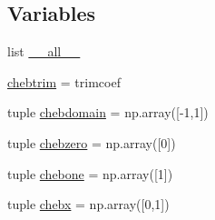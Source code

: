 \subsection*{Variables}
\begin{DoxyCompactItemize}
\item 
list \hyperlink{namespacepyneb_1_1utils_1_1chebyshev_aa4a022e6ddacd362b83964da5cc5d044}{\-\_\-\-\_\-all\-\_\-\-\_\-}
\item 
\hyperlink{namespacepyneb_1_1utils_1_1chebyshev_ab0a0ced0266ea763728bee66b728cbff}{chebtrim} = trimcoef
\item 
tuple \hyperlink{namespacepyneb_1_1utils_1_1chebyshev_abd5a8e86847ca6ea59d2a192f28604d4}{chebdomain} = np.\-array(\mbox{[}-\/1,1\mbox{]})
\item 
tuple \hyperlink{namespacepyneb_1_1utils_1_1chebyshev_aadda3e168aefd0f4b28a9d7cab6ad412}{chebzero} = np.\-array(\mbox{[}0\mbox{]})
\item 
tuple \hyperlink{namespacepyneb_1_1utils_1_1chebyshev_ad07bc7eff7bee500f8644792e4f69712}{chebone} = np.\-array(\mbox{[}1\mbox{]})
\item 
tuple \hyperlink{namespacepyneb_1_1utils_1_1chebyshev_a0ce7dddbafb225b28442052d01115054}{chebx} = np.\-array(\mbox{[}0,1\mbox{]})
\end{DoxyCompactItemize}



